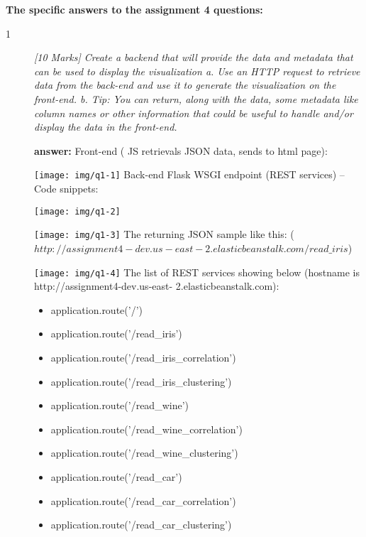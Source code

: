 \documentclass[]{report}
\begin{document}
\textbf{The specific answers to the assignment 4 questions:}
\begin{description}
\item[1]
{\em [10 Marks] Create a backend that will provide the data and metadata that can be used to display the visualization
a.	Use an HTTP request to retrieve data from the back-end and use it to generate the visualization on the front-end.
b.	Tip: You can return, along with the data, some metadata like column names or other information that could be useful to handle and/or display the data in the front-end.}

\textbf{answer:}
Front-end ( JS retrievals JSON data, sends to html page):

\texttt{[image: img/q1-1]}
\bigbreak
Back-end Flask WSGI endpoint (REST services) – Code snippets:

\texttt{[image: img/q1-2]}

\texttt{[image: img/q1-3]}
\bigbreak
The returning JSON sample like this: ($http://assignment4-dev.us-east-2.elasticbeanstalk.com/read\_iris$)

\texttt{[image: img/q1-4]}
\bigbreak
The list of REST services showing below (hostname is http://assignment4-dev.us-east- 2.elasticbeanstalk.com):
\begin{itemize}
\item application.route('/')

\item application.route('/read\_iris')

\item application.route('/read\_iris\_correlation')

\item application.route('/read\_iris\_clustering')

\item application.route('/read\_wine')

\item application.route('/read\_wine\_correlation')

\item application.route('/read\_wine\_clustering')

\item application.route('/read\_car')

\item application.route('/read\_car\_correlation')

\item application.route('/read\_car\_clustering')


\end{itemize}
\end{description}
\end{document}
